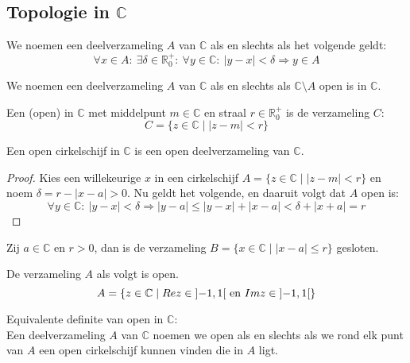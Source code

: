 \documentclass[main.tex]{subfiles}
\begin{document}
\subsection{Topologie in $\mathbb{C}$}
\label{sec:topologie-mathbbc}

\begin{de}
  We noemen een deelverzameling $A$ van $\mathbb{C}$  als en slechts als het volgende geldt:
  \[ \forall x\in A:\ \exists \delta \in \mathbb{R}_{0}^{+}:\ \forall y\in \mathbb{C}:\ |y-x| < \delta \Rightarrow y \in A \]
\end{de}

\begin{de}
  We noemen een deelverzameling $A$ van $\mathbb{C}$  als en slechts als $\mathbb{C} \setminus A$ open is in $\mathbb{C}$.
\end{de}

\begin{de}
  Een (open)  in $\mathbb{C}$ met middelpunt $m\in \mathbb{C}$ en straal $r\in \mathbb{R}_{0}^{+}$ is de verzameling $C$:
  \[ C = \{ z \in \mathbb{C} \mid |z-m| < r \} \]
\end{de}

\begin{st}
  Een open cirkelschijf in $\mathbb{C}$ is een open deelverzameling van $\mathbb{C}$.

  \begin{proof}
    Kies een willekeurige $x$ in een cirkelschijf $A = \{ z \in \mathbb{C} \mid |z-m| < r \}$ en noem $\delta = r-|x-a| > 0$.
    Nu geldt het volgende, en daaruit volgt dat $A$ open is:
    \[ \forall y\in \mathbb{C}:\ |y-x|<\delta \Rightarrow |y-a| \le |y-x|+|x-a| < \delta + |x+a| = r \]
  \end{proof}
\end{st}

\begin{vb}
  Zij $a\in \mathbb{C}$ en $r>0$, dan is de verzameling $B = \{x\in \mathbb{C}\mid |x-a|\le r\}$ gesloten.

\end{vb}

\begin{vb}
  De verzameling $A$ als volgt is open.
  \[ A = \left\{z \in \mathbb{C} \mid Re z \in \interval[open]{-1}{1} \text{ en } Im z \in \interval[open]{-1}{1} \right\} \]

\end{vb}

\begin{st}
  Equivalente definite van open in $\mathbb{C}$:\\
  Een deelverzameling $A$ van $\mathbb{C}$ noemen we open als en slechts als we rond elk punt van $A$ een open cirkelschijf kunnen vinden die in $A$ ligt.
\end{st}




\end{document}
